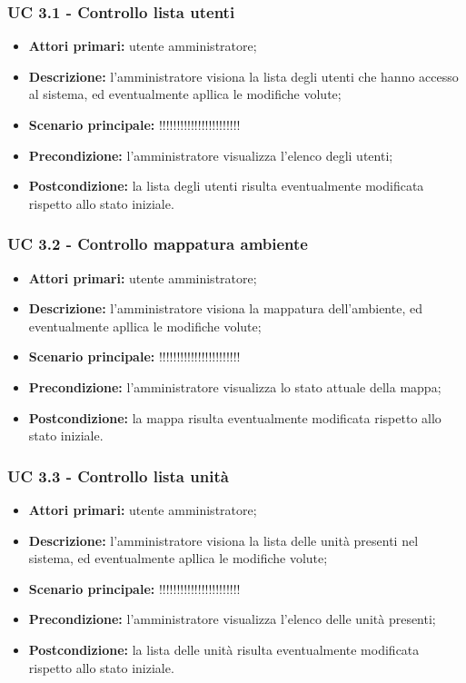 \subsubsection{UC 3.1 - Controllo lista utenti}
	\begin{itemize}
		\item \textbf{Attori primari:} utente amministratore;
		\item \textbf{Descrizione:} l'amministratore visiona la lista degli utenti che hanno accesso al sistema, ed eventualmente apllica le modifiche volute;
		\item \textbf{Scenario principale:} !!!!!!!!!!!!!!!!!!!!!!!
		\item \textbf{Precondizione:} l'amministratore visualizza l'elenco degli utenti;
		\item \textbf{Postcondizione:} la lista degli utenti risulta eventualmente modificata rispetto allo stato iniziale.
	\end{itemize}

\subsubsection{UC 3.2 - Controllo mappatura ambiente}
	\begin{itemize}
		\item \textbf{Attori primari:} utente amministratore;
		\item \textbf{Descrizione:} l'amministratore visiona la mappatura dell'ambiente, ed eventualmente apllica le modifiche volute;
		\item \textbf{Scenario principale:} !!!!!!!!!!!!!!!!!!!!!!!
		\item \textbf{Precondizione:} l'amministratore visualizza lo stato attuale della mappa;
		\item \textbf{Postcondizione:} la mappa risulta eventualmente modificata rispetto allo stato iniziale.
	\end{itemize}

\subsubsection{UC 3.3 - Controllo lista unità}
	\begin{itemize}
		\item \textbf{Attori primari:} utente amministratore;
		\item \textbf{Descrizione:} l'amministratore visiona la lista delle unità presenti nel sistema, ed eventualmente apllica le modifiche volute;
		\item \textbf{Scenario principale:} !!!!!!!!!!!!!!!!!!!!!!!
		\item \textbf{Precondizione:} l'amministratore visualizza l'elenco delle unità presenti;
		\item \textbf{Postcondizione:} la lista delle unità risulta eventualmente modificata rispetto allo stato iniziale.
	\end{itemize}
